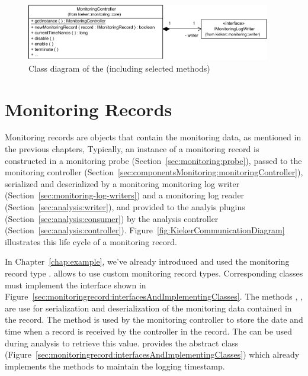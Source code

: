 \begin{figure}[H]\centering
\includegraphics[width=0.95\textwidth]{images/kieker_monitoringControlleruserguide-simplified}
\caption{Class diagram of the  (including selected methods)}
\label{fig:monitoringController:classdiagram}
\end{figure}


\section{Monitoring Records}\label{sec:componentsMonitoring:monitoringRecords}

Monitoring records are objects that contain the monitoring data, as mentioned %
in the previous chapters, Typically, an instance of a monitoring record is %
constructed in a monitoring probe (Section~\ref{sec:monitoring:probe}), %
passed to the monitoring controller (Section~\ref{sec:componentsMonitoring:monitoringController}), %
serialized and deserialized by a monitoring %
monitoring log writer (Section~\ref{sec:monitoring-log-writers}) and a
monitoring log reader (Section~\ref{sec:analysis:writer}), and provided to the %
analyis plugins (Section~\ref{sec:analysis:consumer}) %
by the analysis controller (Section~\ref{sec:analysis:controller}). %
Figure~\ref{fig:KiekerCommunicationDiagram} illustrates this life cycle of a monitoring %
record. %

In Chapter~\ref{chap:example}, we've already introduced and used the monitoring %
record type . \Kieker{} allows to use custom %
monitoring record types. Corresponding classes must implement the %
interface  shown in Figure~\ref{sec:monitoringrecord:interfacesAndImplementingClasses}. %
The methods , ,  %
are use for serialization and deserialization of the monitoring data contained %
in the record. The method  is used by the monitoring controller to %
store the date and time when a record is received by the controller in the %
record. The  can be used during analysis to retrieve %
this value. \KiekerMonitoringPart{} provides the abstract class %
 (Figure~\ref{sec:monitoringrecord:interfacesAndImplementingClasses}) %
which already implements the methods to maintain the logging timestamp. 

